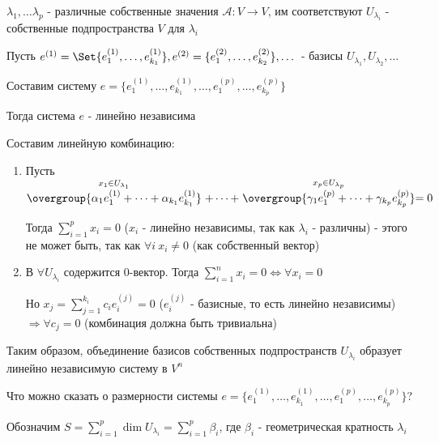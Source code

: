 \documentclass[12pt]{article}
\begin{document}
    \begin{MyTheorem}
        \Ths $\lambda_1, \dots \lambda_p$ - различные собственные значения $\mathcal{A} : V \rightarrow V$,
        им соответствуют $U_{\lambda_i}$ - собственные подпространства $V$ для $\lambda_i$

        Пусть $e^{(1)} = \Set{e^{(1)}_1, \dots, e^{(1)}_{k_1}}, e^{(2)} = \{e^{(2)}_1, \dots, e^{(2)}_{k_2}\}, \dots$ -
        базисы $U_{\lambda_1}, U_{\lambda_2}, \dots$

        Составим систему $e = \{e^{(1)}_1, \dots, e^{(1)}_{k_1}, \dots, e^{(p)}_1, \dots, e^{(p)}_{k_p}\}$

        Тогда система $e$ - линейно независима
    \end{MyTheorem}

    \begin{MyProof}
        Составим линейную комбинацию:

        \begin{enumerate}
            \item Пусть $\stackrel{x_1 \in U_{\lambda_1}}{\overgroup{\alpha_1 e^{(1)}_1 + \dots + \alpha_{k_1} e^{(1)}_{k_1}}} + \dots +
            \stackrel{x_p \in U_{\lambda_p}}{\overgroup{\gamma_1 e^{(p)}_1 + \dots + \gamma_{k_p} e^{(p)}_{k_p}}} = 0$

            Тогда $\sum_{i=1}^p x_i = 0$ ($x_i$ - линейно независимы, так как $\lambda_i$ - различны) - этого не может быть, так как $\forall i \ x_i \neq 0$ (как собственный вектор)

            \item В $\forall U_{\lambda_i}$ содержится $0$-вектор. Тогда $\sum_{i=1}^n x_i = 0 \Longleftrightarrow \forall x_i = 0$

            Но $x_j = \sum_{j=1}^{k_i} c_i e^{(j)}_i = 0$ ($e^{(j)}_i$ - базисные, то есть линейно независимы) $\Longrightarrow \forall c_j = 0$ (комбинация должна быть тривиальна)
        \end{enumerate}
    \end{MyProof}

    \Nota Таким образом, объединение базисов собственных подпространств $U_{\lambda_i}$ образует линейно независимую систему в $V^n$

    Что можно сказать о размерности системы $e = \{e^{(1)}_1, \dots, e^{(1)}_{k_1}, \dots, e^{(p)}_1, \dots, e^{(p)}_{k_p}\}$?

    Обозначим $S = \sum_{i=1}^p \dim U_{\lambda_i} = \sum_{i=1}^p \beta_i$, где $\beta_i$ - геометрическая кратность $\lambda_i$
\end{document}
